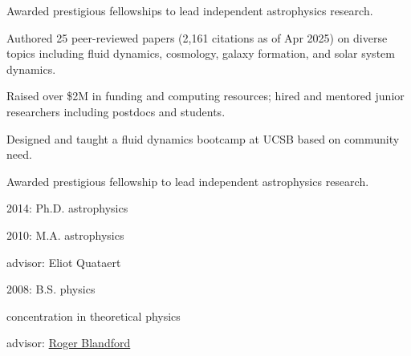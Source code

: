 
\begin{innerlist}
\item Awarded prestigious fellowships to lead independent astrophysics research.
\item Authored 25 peer-reviewed papers (2,161 citations as of Apr 2025) on diverse topics including fluid dynamics, cosmology, galaxy formation, and solar system dynamics.
\item Raised over \$2M in funding and computing resources; hired and mentored junior researchers including postdocs and students.
\item Designed and taught a fluid dynamics bootcamp at UCSB based on community need.
\end{innerlist}



\begin{innerlist}
\item Awarded prestigious fellowship to lead independent astrophysics research.
\end{innerlist}


\begin{innerlist}
\item 2014: Ph.D. astrophysics
\item 2010: M.A. astrophysics
\item advisor: Eliot Quataert
\end{innerlist}


\begin{innerlist}
\item 2008: B.S. physics
\item concentration in theoretical physics
\item advisor: \href{https://en.wikipedia.org/wiki/Roger_Blandford}{Roger Blandford}
\end{innerlist}
